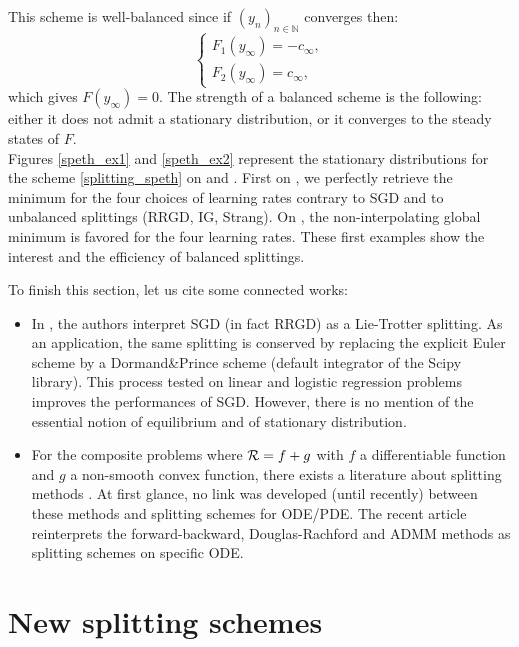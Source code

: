\documentclass[article,authoryear,jmlmc]{beg_32}             %
\begin{document}
This scheme is well-balanced since if $(y_n)_{n\in \mathbb{N}}$ converges then:
\begin{equation*}
	\left\{
	\begin{array}{ll}
		F_1(y_{\infty})=-c_{\infty}, \\
		F_2(y_{\infty})=c_{\infty},
	\end{array}
	\right.
\end{equation*}
which gives $F(y_{\infty})=0$. The strength of a balanced scheme is the following: either it does not admit a stationary distribution, or it converges to the steady states of $F$.\\
Figures \ref{speth_ex1} and \ref{speth_ex2} represent the stationary distributions for the scheme \eqref{splitting_speth} on \exOne and \exTwo. First on \exOne, we perfectly retrieve the minimum for the four choices of learning rates contrary to SGD and to unbalanced splittings (RRGD, IG, Strang). On \exTwo, the non-interpolating global minimum is favored for the four learning rates. These first examples show the interest and the efficiency of balanced splittings. 

\begin{remark}
	To finish this section, let us cite some connected works:
	\begin{itemize}
		\item In \cite{splitting_sgd}, the authors interpret SGD (in fact RRGD) as a Lie-Trotter splitting. As an application, the same splitting is conserved by replacing the explicit Euler scheme by a Dormand\&Prince scheme (default integrator of the Scipy library). This process tested on linear and logistic regression problems improves the performances of SGD. However, there is no mention of the essential notion of equilibrium and of stationary distribution. 
		\item For the composite problems where $\mathcal{R}=f+g$ with $f$ a differentiable function and $g$ a non-smooth convex function, there exists a literature about splitting methods \cite{splitting_proximal}. At first glance, no link was developed (until recently) between these methods and splitting schemes for ODE/PDE. The recent article \cite{splitting_proximal_ode} reinterprets the forward-backward, Douglas-Rachford and ADMM methods as splitting schemes on specific ODE.   
	\end{itemize}
\end{remark}

\section{New splitting schemes}
\label{new_splitting}
\end{document}
